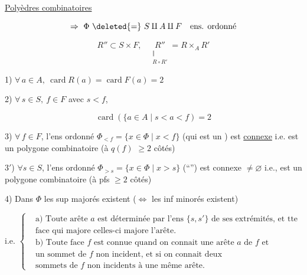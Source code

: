 
\uline{Polyèdres combinatoires}



\[
\Rightarrow\ \Phi\ \deleted{=}\ S\amalg A\amalg F
\quad\text{ens. ordonné}
\]

\[
 R''\subset S\times F,\quad
 \underset{\substack{\Vert\\R\circ R'}}{R''}=R\times_A R'
\]


1) $\forall\,a\in A,\ \operatorname{card}R(a)=\operatorname{card}F(a)=2$

2) $\forall\,s\in S,\ f\in F$ avec $s<f$,

\[
 \operatorname{card}(\{a\in A\mid s<a<f)=2
\]

3) $\forall\, f\in F$, l'ens ordonné $\Phi_{<f}=\{x\in\Phi\mid x<f\}$ (qui est un ) est \uline{connexe} \inserted{$\ne\varnothing$} i.e. est un polygone combinatoire (à $q(f)$ $\geq 2$ côtés)

3$'$) $\forall s\in S$, l'ens ordonné $\Phi_{>s}=\{x\in\Phi\mid x>s\}$ (``\quad '') est connexe $\ne\varnothing$ i.e., est un polygone combinatoire (à pfs $\geq 2$ côtés)


4) Dans $\Phi$ les sup majorés existent ($\Longleftrightarrow$ les inf minorés existent)


i.e. $\left\{\begin{aligned}
 &\text{a) Toute arête $a$ est déterminée par l'ens $\{s,s'\}$ de ses extrémités, et tte}\\
 &\text{face qui majore celles-ci majore l'arête.}\\
 &\text{b) Toute face $f$ est connue quand on connait une arête $a$ de $f$ et}\\
 &\text{un sommet de $f$ non incident, et si on connait deux}\\
 &\text{sommets de $f$ non incidents à une même arête.}
\end{aligned}\right.$

